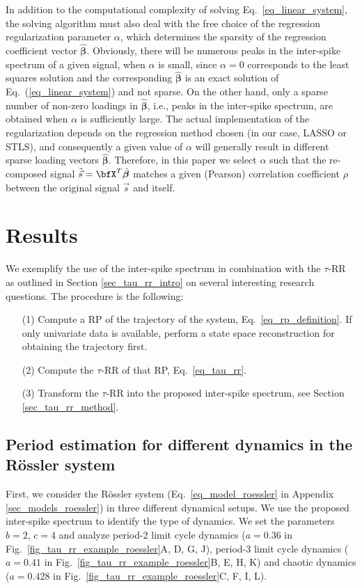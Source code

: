 \documentclass[entropy,article,submit,pdftex,moreauthors]{Definitions/mdpi}
\begin{document}
In addition to the computational complexity of solving Eq.~\eqref{eq_linear_system}, the solving algorithm must also deal with the free choice of the regression regularization parameter $\alpha$, 
which determines the sparsity of the regression coefficient vector $\hat{\boldsymbol\beta}$. Obviously, there will be numerous peaks in the inter-spike spectrum of a given signal, when $\alpha$ is small, 
since $\alpha=0$ corresponds to the least squares solution and the corresponding $\hat{\boldsymbol\beta}$ is an exact solution of Eq.~(\ref{eq_linear_system}) and not sparse. On the other hand, 
only a sparse number of non-zero loadings in $\hat{\boldsymbol\beta}$, i.e., peaks in the inter-spike spectrum, are obtained when $\alpha$ is sufficiently large. 
The actual implementation of the regularization depends on the regression method chosen (in our case, LASSO or STLS), and consequently a given value of $\alpha$ will generally result in 
different sparse loading vectors $\hat{\boldsymbol\beta}$. Therefore, in this paper we select $\alpha$ such that the re-composed signal $\tilde{\vec{s}}=\bfX^T\hat{\boldsymbol\beta}$ matches a 
given (Pearson) correlation coefficient $\rho$ between the original signal $\vec{s}$ and itself.

\section{Results}\label{sec_tau_rr_application}

We exemplify the use of the inter-spike spectrum in combination with the $\tau$-RR as outlined in 
Section \ref{sec_tau_rr_intro} on several interesting research questions. The procedure is the following:
\begin{itemize}[noitemsep]
\item[(1)] Compute a RP of the trajectory of the system, Eq.~\eqref{eq_rp_definition}. If only univariate data is available, perform a state space reconstruction for obtaining the trajectory first.
\item[(2)] Compute the $\tau$-RR of that RP, Eq.~\eqref{eq_tau_rr}.
\item[(3)] Transform the $\tau$-RR into the proposed inter-spike spectrum, see Section \ref{sec_tau_rr_method}.
\end{itemize}


\subsection{Period estimation for different dynamics in the R\"ossler system}
First, we consider the R\"ossler system (Eq.~\eqref{eq_model_roessler} in Appendix \ref{sec_models_roessler}) 
in three different dynamical setups. We use the proposed inter-spike spectrum to
identify the type of dynamics.
We set the parameters $b=2$, $c=4$ and analyze period-2 limit cycle dynamics ($a=0.36$ in Fig.~\ref{fig_tau_rr_example_roessler}A, D, G, J), 
period-3 limit cycle dynamics ($a=0.41$ in Fig.~\ref{fig_tau_rr_example_roessler}B, E, H, K) and chaotic dynamics ($a=0.428$ in Fig.~\ref{fig_tau_rr_example_roessler}C, F, I, L).  
\end{document}
